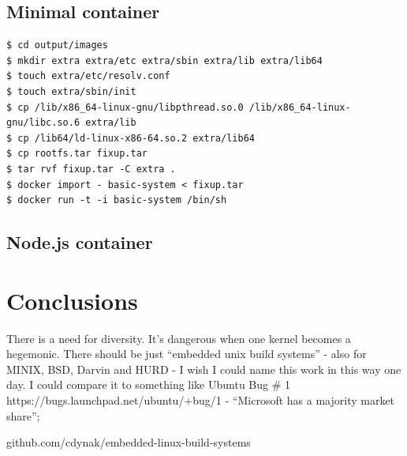 \documentclass[printmode]{mgr}
\begin{document}
\section{Minimal container}

\begin{lstlisting}
$ cd output/images
$ mkdir extra extra/etc extra/sbin extra/lib extra/lib64
$ touch extra/etc/resolv.conf
$ touch extra/sbin/init
$ cp /lib/x86_64-linux-gnu/libpthread.so.0 /lib/x86_64-linux-gnu/libc.so.6 extra/lib
$ cp /lib64/ld-linux-x86-64.so.2 extra/lib64
$ cp rootfs.tar fixup.tar
$ tar rvf fixup.tar -C extra .
$ docker import - basic-system < fixup.tar
$ docker run -t -i basic-system /bin/sh
\end{lstlisting}

\section{Node.js container}


\chapter{Conclusions}
\label{chapter:conclusions}

There is a need for diversity. It's dangerous when one kernel becomes a hegemonic. There should be just ``embedded unix build systems'' - also for MINIX, BSD, Darvin and HURD - I wish I could name this work in this way one day. I could compare it to something like Ubuntu Bug \# 1 https://bugs.launchpad.net/ubuntu/+bug/1 - ``Microsoft has a majority market share'';

github.com/cdynak/embedded-linux-build-systems






\end{document}
